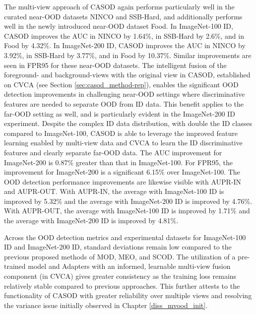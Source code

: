 The multi-view approach of CASOD again performs particularly well in the curated near-OOD datasets NINCO and SSB-Hard, and additionally performs well in the newly introduced near-OOD dataset Food. In ImageNet-100 ID, CASOD improves the AUC in NINCO by 1.64\%, in SSB-Hard by 2.6\%, and in Food by 4.32\%. In ImageNet-200 ID, CASOD improves the AUC in NINCO by 3.92\%, in SSB-Hard by 3.77\%, and in Food by 10.37\%. Similar improvements are seen in FPR95 for these near-OOD datasets. The intelligent fusion of the foreground- and background-views with the original view in CASOD, established on CVCA (see Section \ref{sec:casod_method-rep}), enables the significant OOD detection improvements in challenging near-OOD settings where discriminative features are needed to separate OOD from ID data. This benefit applies to the far-OOD setting as well, and is particularly evident in the ImageNet-200 ID experiment. Despite the complex ID data distribution, with double the ID classes compared to ImageNet-100, CASOD is able to leverage the improved feature learning enabled by multi-view data and CVCA to learn the ID discriminative features and clearly separate far-OOD data. The AUC improvement for ImageNet-200 is 0.87\% greater than that in ImageNet-100. For FPR95, the improvement for ImageNet-200 is a significant 6.15\% over ImageNet-100. The OOD detection performance improvements are likewise visible with AUPR-IN and AUPR-OUT. With AUPR-IN, the average with ImageNet-100 ID is improved by 5.32\% and the average with ImageNet-200 ID is improved by 4.76\%. With AUPR-OUT, the average with ImageNet-100 ID is improved by 1.71\% and the average with ImageNet-200 ID is improved by 4.81\%. %

Across the OOD detection metrics and experimental datasets for ImageNet-100 ID and ImageNet-200 ID, standard deviations remain low compared to the previous proposed methods of MOD, MEO, and SCOD. The utilization of a pre-trained model and Adapters with an informed, learnable multi-view fusion component (in CVCA) gives greater consistency as the training loss remains relatively stable compared to previous approaches. This further attests to the functionality of CASOD with greater reliability over multiple views and resolving the variance issue initially observed in Chapter \ref{diss_mvood_init}.

